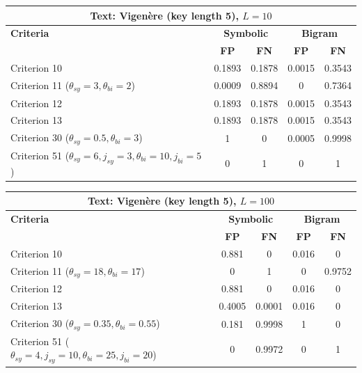 \begin{center}
\renewcommand{\arraystretch}{1.2}
\setlength{\tabcolsep}{6pt}
\begin{tabular}{|l||c|c||c|c|}
\hline
\multicolumn{5}{|c|}{\textbf{Text: Vigenère (key length 5), $L=10$}} \\
\hline
\textbf{Criteria} & \multicolumn{2}{c||}{\textbf{Symbolic}} & \multicolumn{2}{c|}{\textbf{Bigram}} \\
\hline
 & \textbf{FP} & \textbf{FN} & \textbf{FP} & \textbf{FN} \\
\hline
Criterion 10 & 0.1893 & 0.1878 & 0.0015 & 0.3543 \\
Criterion 11 ($\theta_{sy}=3, \theta_{bi}=2$) & 0.0009 & 0.8894 & 0 & 0.7364 \\
Criterion 12 & 0.1893 & 0.1878 & 0.0015 & 0.3543 \\
Criterion 13 & 0.1893 & 0.1878 & 0.0015 & 0.3543 \\
Criterion 30 ($\theta_{sy}=0.5, \theta_{bi}=3$) & 1 & 0 & 0.0005 & 0.9998 \\
Criterion 51 ($\theta_{sy}=6, j_{sy}=3, \theta_{bi}=10, j_{bi}=5$) & 0 & 1 & 0 & 1 \\
\hline
\end{tabular}
\end{center}

\begin{center}
\renewcommand{\arraystretch}{1.2}
\setlength{\tabcolsep}{6pt}
\begin{tabular}{|l||c|c||c|c|}
\hline
\multicolumn{5}{|c|}{\textbf{Text: Vigenère (key length 5), $L=100$}} \\
\hline
\textbf{Criteria} & \multicolumn{2}{c||}{\textbf{Symbolic}} & \multicolumn{2}{c|}{\textbf{Bigram}} \\
\hline
 & \textbf{FP} & \textbf{FN} & \textbf{FP} & \textbf{FN} \\
\hline
Criterion 10 & 0.881 & 0 & 0.016 & 0 \\
Criterion 11 ($\theta_{sy}=18, \theta_{bi}=17$) & 0 & 1 & 0 & 0.9752 \\
Criterion 12 & 0.881 & 0 & 0.016 & 0 \\
Criterion 13 & 0.4005 & 0.0001 & 0.016 & 0 \\
Criterion 30 ($\theta_{sy}=0.35, \theta_{bi}=0.55$) & 0.181 & 0.9998 & 1 & 0 \\
Criterion 51 ($\theta_{sy}=4, j_{sy}=10, \theta_{bi}=25, j_{bi}=20$) & 0 & 0.9972 & 0 & 1 \\
\hline
\end{tabular}
\end{center}

